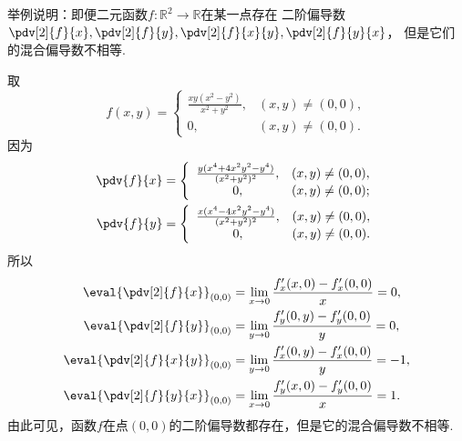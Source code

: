 \begin{example}
举例说明：即便二元函数\(f\colon\mathbb{R}^2\to\mathbb{R}\)在某一点存在
二阶偏导数\(\pdv[2]{f}{x},\pdv[2]{f}{y},\pdv[2]{f}{x}{y},\pdv[2]{f}{y}{x}\)，
但是它们的混合偏导数不相等.
\begin{solution}
取\begin{equation*}
	f(x,y) = \left\{ \begin{array}{cl}
		\frac{xy(x^2-y^2)}{x^2+y^2}, & (x,y)\neq(0,0), \\
		0, & (x,y)\neq(0,0).
	\end{array} \right.
\end{equation*}
因为\begin{align*}
	\pdv{f}{x} &= \left\{ \begin{array}{cl}
		\frac{y(x^4+4x^2y^2-y^4)}{(x^2+y^2)^2}, & (x,y)\neq(0,0), \\
		0, & (x,y)\neq(0,0);
	\end{array} \right. \\
	\pdv{f}{y} &= \left\{ \begin{array}{cl}
		\frac{x(x^4-4x^2y^2-y^4)}{(x^2+y^2)^2}, & (x,y)\neq(0,0), \\
		0, & (x,y)\neq(0,0).
	\end{array} \right.
\end{align*}
所以\begin{align*}
	\eval{\pdv[2]{f}{x}}_{(0,0)}
	&= \lim_{x\to0} \frac{f'_x(x,0) - f'_x(0,0)}{x}
	= 0, \\
	\eval{\pdv[2]{f}{y}}_{(0,0)}
	&= \lim_{y\to0} \frac{f'_y(0,y) - f'_y(0,0)}{y}
	= 0, \\
	\eval{\pdv[2]{f}{x}{y}}_{(0,0)}
	&= \lim_{y\to0} \frac{f'_x(0,y) - f'_x(0,0)}{y}
	= -1, \\
	\eval{\pdv[2]{f}{y}{x}}_{(0,0)}
	&= \lim_{x\to0} \frac{f'_y(x,0) - f'_y(0,0)}{x}
	= 1.
\end{align*}
由此可见，函数\(f\)在点\((0,0)\)的二阶偏导数都存在，但是它的混合偏导数不相等.
\end{solution}
\end{example}

